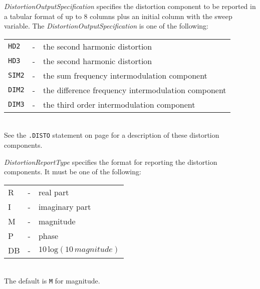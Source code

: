 {
\begin{widelist}
\item[{\it DistortionOutputSpecification}]
     specifies the distortion component to be reported
     in a tabular format of up to 8 columns plus an initial column with the sweep
     variable.  The {\it DistortionOutputSpecification} is one of the
     following:\\
      \offset\begin{tabular}{lcp{3.5in}}
      {\tt HD2} &-&the second harmonic distortion\\
      {\tt HD3} &-&the second harmonic distortion\\
      {\tt SIM2} &-&the sum frequency intermodulation component\\
      {\tt DIM2} &-&the difference frequency intermodulation component\\
      {\tt DIM3} &-&the third order intermodulation component
      \end{tabular}\\[0.1in]
      See the {\tt .DISTO} statement on page \pageref{.DISTOstatement} for
      a description of these distortion components.

\item[{\it DistortionReportType }]
     specifies the format for reporting the distortion components.
     It  must be one of the
     following:\\
      \offset\begin{tabular}{lcp{3.5in}}
      R &-&real part\\
      I &-&imaginary part\\
      M &-&magnitude\\
      P &-&phase\\
      DB &-&$10\,\mbox{log}(10\,magnitude)$
      \end{tabular}\\[0.1in]
      The default is {\tt M} for magnitude.
\end{widelist}
      }


